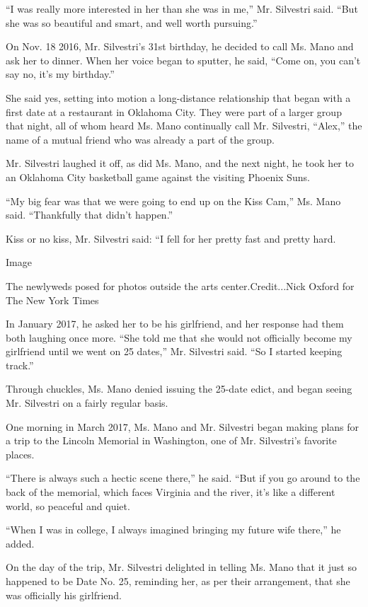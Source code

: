 ``I was really more interested in her than she was in me,'' Mr.
Silvestri said. ``But she was so beautiful and smart, and well worth
pursuing.''

On Nov. 18 2016, Mr. Silvestri's 31st birthday, he decided to call Ms.
Mano and ask her to dinner. When her voice began to sputter, he said,
``Come on, you can't say no, it's my birthday.''

She said yes, setting into motion a long-distance relationship that
began with a first date at a restaurant in Oklahoma City. They were part
of a larger group that night, all of whom heard Ms. Mano continually
call Mr. Silvestri, ``Alex,'' the name of a mutual friend who was
already a part of the group.

Mr. Silvestri laughed it off, as did Ms. Mano, and the next night, he
took her to an Oklahoma City basketball game against the visiting
Phoenix Suns.

``My big fear was that we were going to end up on the Kiss Cam,'' Ms.
Mano said. ``Thankfully that didn't happen.''

Kiss or no kiss, Mr. Silvestri said: ``I fell for her pretty fast and
pretty hard.

Image

The newlyweds posed for photos outside the arts center.Credit...Nick
Oxford for The New York Times

In January 2017, he asked her to be his girlfriend, and her response had
them both laughing once more. ``She told me that she would not
officially become my girlfriend until we went on 25 dates,'' Mr.
Silvestri said. ``So I started keeping track.''

Through chuckles, Ms. Mano denied issuing the 25-date edict, and began
seeing Mr. Silvestri on a fairly regular basis.

One morning in March 2017, Ms. Mano and Mr. Silvestri began making plans
for a trip to the Lincoln Memorial in Washington, one of Mr. Silvestri's
favorite places.

``There is always such a hectic scene there,'' he said. ``But if you go
around to the back of the memorial, which faces Virginia and the river,
it's like a different world, so peaceful and quiet.

``When I was in college, I always imagined bringing my future wife
there,'' he added.

On the day of the trip, Mr. Silvestri delighted in telling Ms. Mano that
it just so happened to be Date No. 25, reminding her, as per their
arrangement, that she was officially his girlfriend.


